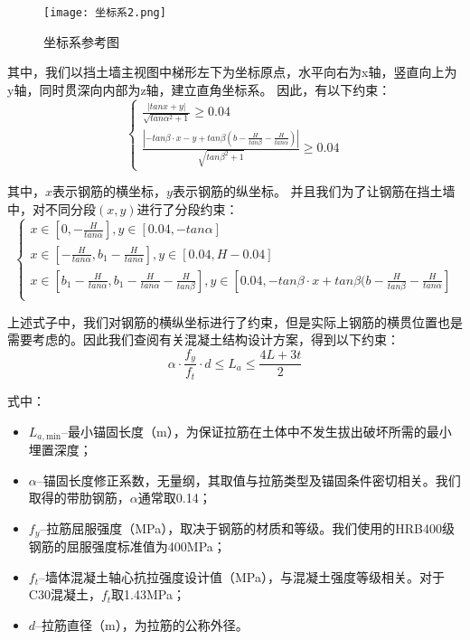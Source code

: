 \documentclass[withoutpreface,bwprint]{cumcmthesis}
\begin{document}
    \begin{figure}[H]
    \centering
    \texttt{[image: 坐标系2.png]}
    \caption{坐标系参考图}
    \label{fig:{坐标系参考图}}
    \end{figure}

其中，我们以挡土墙主视图中梯形左下为坐标原点，水平向右为x轴，竖直向上为y轴，同时贯深向内部为z轴，建立直角坐标系。
因此，有以下约束：
    \begin{equation}
            \left\{\begin{matrix} 
                \frac{|tanx+y|}{\sqrt{tan\alpha^2+1} } \ge 0.04\\
                \frac{|-tan\beta \cdot x-y+tan\beta(b-\frac{H}{tan\beta}- \frac{H}{tan\alpha})|}{\sqrt{tan\beta^2+1} }\ge 0.04 
            \end{matrix}\right.  
    \end{equation}
    \par
其中，$x$表示钢筋的横坐标，$y$表示钢筋的纵坐标。
并且我们为了让钢筋在挡土墙中，对不同分段$(x,y)$进行了分段约束：
    \begin{equation}
        \left\{\begin{matrix} 
            x\in [0,-\frac{H}{tan\alpha } ],y\in [0.04, -tan\alpha ] \\
            x\in [-\frac{H}{tan\alpha } ,b_1-\frac{H}{tan\alpha } ],y\in [0.04, H-0.04 ] \\
            x\in [b_1-\frac{H}{tan\alpha } ,b_1-\frac{H}{tan\alpha }- \frac{H}{tan\beta }],y\in [0.04, -tan\beta \cdot x+tan\beta(b-\frac{H}{tan\beta}- \frac{H}{tan\alpha} ] \\
        \end{matrix}\right.  
    \end{equation}

上述式子中，我们对钢筋的横纵坐标进行了约束，但是实际上钢筋的横贯位置也是需要考虑的。因此我们查阅有关混凝土结构设计方案，得到以下约束：
    \begin{equation}
        \alpha \cdot \frac{f_y}{f_t} \cdot d\le L_a\le \frac{4L+3t}{2} 
    \end{equation}\par
式中：
    \begin{itemize}
        \item $L_{a,\text{min}}$--最小锚固长度（m），为保证拉筋在土体中不发生拔出破坏所需的最小埋置深度；
        \item $\alpha$--锚固长度修正系数，无量纲，其取值与拉筋类型及锚固条件密切相关。我们取得的带肋钢筋，$\alpha$通常取0.14；
        \item $f_y$--拉筋屈服强度（MPa），取决于钢筋的材质和等级。我们使用的HRB400级钢筋的屈服强度标准值为400MPa；
        \item $f_t$--墙体混凝土轴心抗拉强度设计值（MPa），与混凝土强度等级相关。对于C30混凝土，$f_t$取1.43MPa；
        \item $d$--拉筋直径（m），为拉筋的公称外径。
    \end{itemize}
\end{document}
